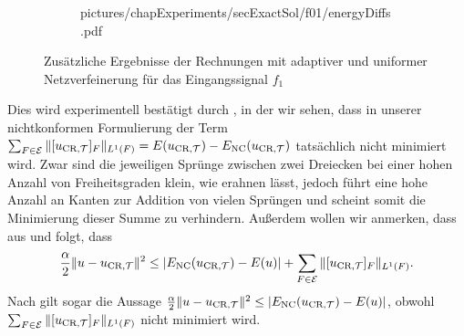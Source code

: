 \begin{figure}[p]
\begin{subfigure}[b]{.48\linewidth}
      {pictures/chapExperiments/secExactSol/f01/energyDiffs.pdf}
    \label{fig:f01DiffGuebExactE}
  \end{subfigure}
  \caption{Zusätzliche Ergebnisse der Rechnungen mit adaptiver und uniformer 
    Netzverfeinerung für das Eingangssignal $f_1$}
  \label{fig:f01SupplementaryInfo}
\end{figure}
Dies wird experimentell bestätigt durch , in der wir
sehen, dass in unserer nichtkonformen Formulierung 
der Term $\sum_{F\in\mathcal{E}}\Vert[u_{\textup{CR}, \mathcal{T}}]_F\Vert_{L^1(F)}=E(u_{\textup{CR}, \mathcal{T}})-E_\textup{NC}(u_{\textup{CR}, \mathcal{T}})$
tatsächlich nicht minimiert wird. 
Zwar sind die jeweiligen Sprünge zwischen zwei Dreiecken bei einer hohen Anzahl
von Freiheitsgraden klein, wie  erahnen lässt, jedoch
führt eine hohe Anzahl an Kanten zur Addition von vielen Sprüngen und scheint
somit die Minimierung dieser Summe zu verhindern.
Außerdem wollen wir anmerken, dass aus  und
 folgt, dass
\begin{align*}
  \frac{\alpha}{2}\Vert u-u_{\textup{CR}, \mathcal{T}}\Vert^2
  \leq
  \left|E_\textup{NC}(u_{\textup{CR}, \mathcal{T}})-E(u)\right|+
  \sum_{F\in\mathcal{E}}\Vert[u_{\textup{CR}, \mathcal{T}}]_F\Vert_{L^1(F)}.
\end{align*}
Nach  gilt sogar die Aussage $\frac{\alpha}{2}\Vert
u-u_{\textup{CR}, \mathcal{T}}\Vert^2 \leq \left|E_\textup{NC}(u_{\textup{CR}, \mathcal{T}})-E(u)\right|$, obwohl
$\sum_{F\in\mathcal{E}}\Vert[u_{\textup{CR}, \mathcal{T}}]_F\Vert_{L^1(F)}$ nicht minimiert wird.

